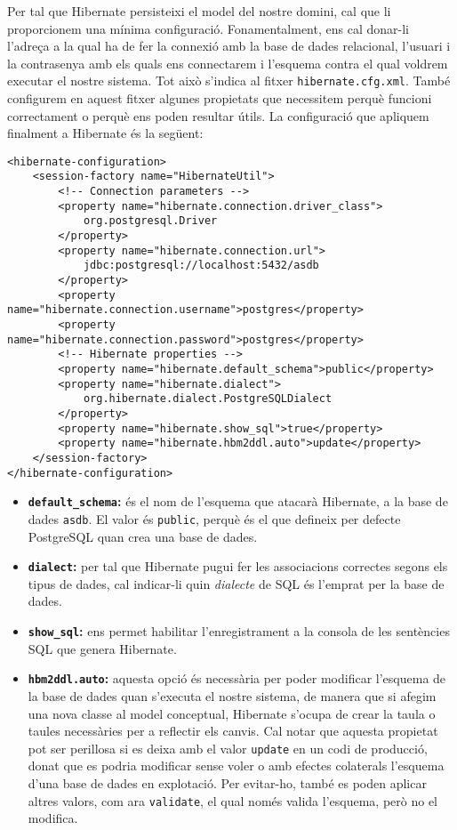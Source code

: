 Per tal que Hibernate persisteixi el model del nostre domini, cal que li proporcionem una mínima configuració. Fonamentalment, ens cal donar-li l'adreça a la qual ha de fer la connexió amb la base de dades relacional, l'usuari i la contrasenya amb els quals ens connectarem i l'esquema contra el qual voldrem executar el nostre sistema. Tot això s'indica al fitxer \texttt{hibernate.cfg.xml}. També configurem en aquest fitxer algunes propietats que necessitem perquè funcioni correctament o perquè ens poden resultar útils. La configuració que apliquem finalment a Hibernate és la següent:

\begin{verbatim}
<hibernate-configuration>
    <session-factory name="HibernateUtil">
        <!-- Connection parameters -->
        <property name="hibernate.connection.driver_class">
            org.postgresql.Driver
        </property>
        <property name="hibernate.connection.url">
            jdbc:postgresql://localhost:5432/asdb
        </property>
        <property name="hibernate.connection.username">postgres</property>
        <property name="hibernate.connection.password">postgres</property>
        <!-- Hibernate properties -->
        <property name="hibernate.default_schema">public</property>
        <property name="hibernate.dialect">
            org.hibernate.dialect.PostgreSQLDialect
        </property>
        <property name="hibernate.show_sql">true</property>
        <property name="hibernate.hbm2ddl.auto">update</property>
    </session-factory>
</hibernate-configuration>
\end{verbatim}

\begin{itemize}
	\item \textbf{\texttt{default\_schema}:} és el nom de l'esquema que atacarà Hibernate, a la base de dades \texttt{asdb}. El valor és \texttt{public}, perquè és el que defineix per defecte PostgreSQL quan crea una base de dades.
	\item \textbf{\texttt{dialect}:} per tal que Hibernate pugui fer les associacions correctes segons els tipus de dades, cal indicar-li quin \emph{dialecte} de SQL és l'emprat per la base de dades.
	\item \textbf{\texttt{show\_sql}:} ens permet habilitar l'enregistrament a la consola de les sentències SQL que genera Hibernate.
	\item \textbf{\texttt{hbm2ddl.auto}:} aquesta opció és necessària per poder modificar l'esquema de la base de dades quan s'executa el nostre sistema, de manera que si afegim una nova classe al model conceptual, Hibernate s'ocupa de crear la taula o taules necessàries per a reflectir els canvis. Cal notar que aquesta propietat pot ser perillosa si es deixa amb el valor \texttt{update} en un codi de producció, donat que es podria modificar sense voler o amb efectes colaterals l'esquema d'una base de dades en explotació. Per evitar-ho, també es poden aplicar altres valors, com ara \texttt{validate}, el qual només valida l'esquema, però no el modifica.
\end{itemize}


